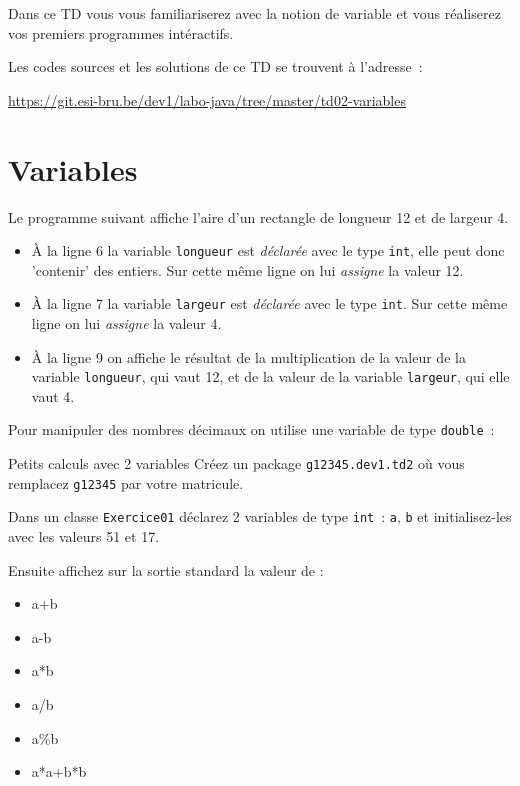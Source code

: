 \documentclass[a4paper,11pt]{article}
\date{2018 -- 2019}
\newcommand{\publicbasepath}
{https://git.esi-bru.be/dev1/labo-java/tree/master/td02-variables}
\begin{document}
\entete
\titre

\lastedit


	Dans ce TD vous vous familiariserez avec la notion de variable et vous 
	réaliserez vos premiers programmes intéractifs.

	Les codes sources et les solutions de ce TD se trouvent à l'adresse~: 
	
	\url{\publicbasepath}	
	
	\tableofcontents

	\newpage
	
\section{Variables}

	Le programme suivant affiche l'aire d'un rectangle de longueur 12 et de largeur 4.
	

	\begin{itemize}
		\item \`A la ligne 6 la variable \texttt{longueur} est \emph{déclarée} 
			avec le type \texttt{int}, elle peut donc 'contenir' des entiers. 
			Sur cette même ligne on lui \emph{assigne} la valeur 12.  

		\item \`A la ligne 7 la variable \texttt{largeur} est \emph{déclarée} avec le type \texttt{int}. 
			Sur cette même ligne on lui \emph{assigne} la valeur 4.
	
		\item \`A la ligne 9 on affiche le résultat de la multiplication de la valeur de la variable \texttt{longueur}, 
			qui vaut 12, et de la valeur de la variable \texttt{largeur}, qui elle vaut 4.  
  	\end{itemize}

	Pour manipuler des nombres décimaux on utilise une variable de type 
	\texttt{double}~:
	




	\begin{Exercice}{Petits calculs avec 2 variables} 		
		Créez un package \texttt{g12345.dev1.td2} où vous remplacez \texttt{g12345} par 
		votre matricule.

		Dans un classe \texttt{Exercice01} déclarez 2 variables de type \texttt{int}~: 
		\texttt{a}, \texttt{b} et initialisez-les avec les valeurs 51 et 17.
		
		Ensuite affichez sur la sortie standard la valeur de :
		\begin{itemize}
		 	\item a+b
			\item a-b
			\item a*b
			\item a/b
			\item a\%b
			\item a*a+b*b
		\end{itemize} 
	\end{Exercice}
\end{document}
